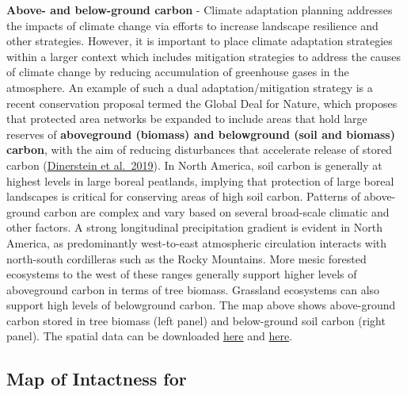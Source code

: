 \documentclass[
]{article}
\begin{document}
\textbf{Above- and below-ground carbon} - Climate adaptation planning
addresses the impacts of climate change via efforts to increase
landscape resilience and other strategies. However, it is important to
place climate adaptation strategies within a larger context which
includes mitigation strategies to address the causes of climate change
by reducing accumulation of greenhouse gases in the atmosphere. An
example of such a dual adaptation/mitigation strategy is a recent
conservation proposal termed the Global Deal for Nature, which proposes
that protected area networks be expanded to include areas that hold
large reserves of \textbf{aboveground (biomass) and belowground (soil
and biomass) carbon}, with the aim of reducing disturbances that
accelerate release of stored carbon
(\href{http://doi.org/10.1126/sciadv.aaw2869}{Dinerstein et al.~2019}).
In North America, soil carbon is generally at highest levels in large
boreal peatlands, implying that protection of large boreal landscapes is
critical for conserving areas of high soil carbon. Patterns of
above-ground carbon are complex and vary based on several broad-scale
climatic and other factors. A strong longitudinal precipitation gradient
is evident in North America, as predominantly west-to-east atmospheric
circulation interacts with north-south cordilleras such as the Rocky
Mountains. More mesic forested ecosystems to the west of these ranges
generally support higher levels of aboveground carbon in terms of tree
biomass. Grassland ecosystems can also support high levels of
belowground carbon. The map above shows above-ground carbon stored in
tree biomass (left panel) and below-ground soil carbon (right panel).
The spatial data can be downloaded
\href{http://globbiomass.org/wp-content/uploads/GB_Maps/Globbiomass_global_dataset.html}{here}
and
\href{https://data.isric.org/geonetwork/srv/eng/catalog.search\#/metadata/c02ddf8b-cbfb-4533-a9c3-7bf0790fd042}{here}.

\pagebreak

\hypertarget{map-of-intactness-for}{%
\subsection{Map of Intactness for}\label{map-of-intactness-for}}
\end{document}
